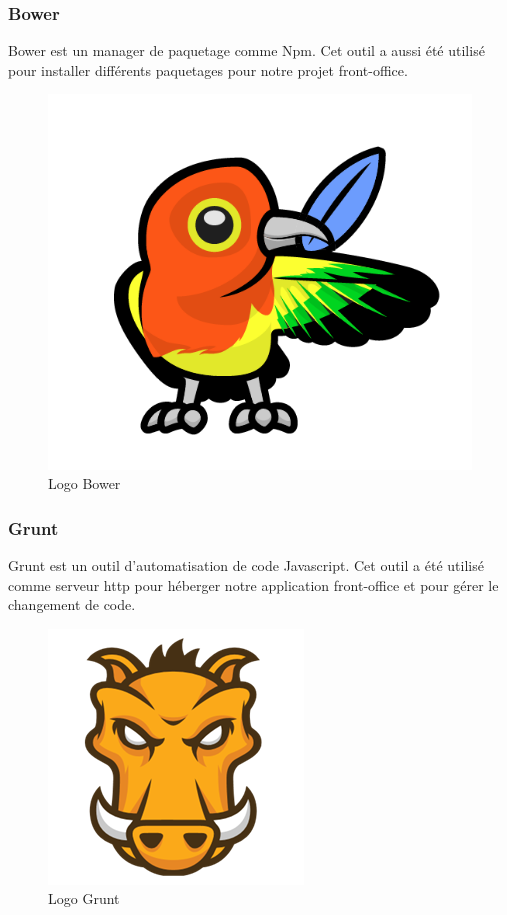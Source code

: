 \subsubsection{Bower}
\noindent\begin{minipage}{0.69\textwidth}
Bower est un manager de paquetage comme Npm. Cet outil a aussi été utilisé pour installer différents paquetages pour notre projet front-office.
\end{minipage}
\begin{minipage}{0.3\textwidth}
\begin{figure}[H]
  \centering
  \includegraphics[scale=0.17]{figures/logo/bower.png}
  \caption{Logo Bower}
  \label{code37}
\end{figure}
\end{minipage}
\subsubsection{Grunt}
\noindent\begin{minipage}{0.69\textwidth}
Grunt est un outil d'automatisation de code Javascript. Cet outil a été utilisé comme serveur http pour héberger notre application front-office et pour gérer le changement de code.
\end{minipage}
\begin{minipage}{0.3\textwidth}
\begin{figure}[H]
  \centering
  \includegraphics[scale=0.25]{figures/logo/grunt.png}
  \caption{Logo Grunt}
  \label{code38}
\end{figure}
\end{minipage}
